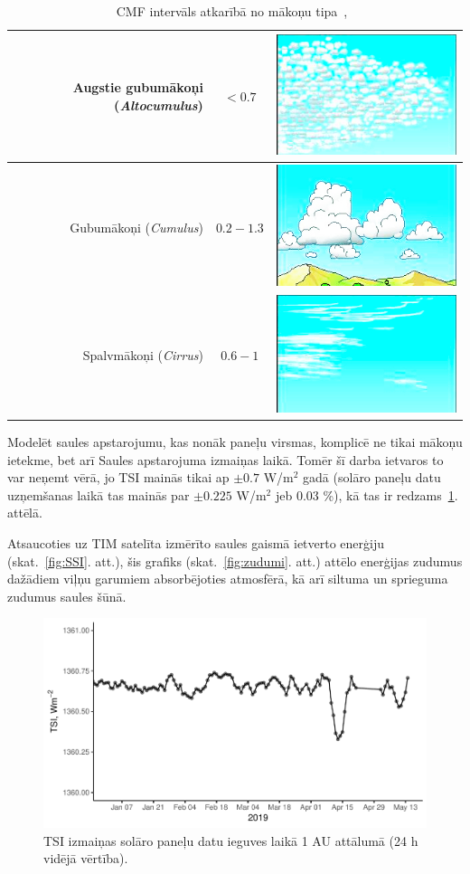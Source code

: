 \begin{table}[h]
	\caption{CMF intervāls atkarībā no mākoņu tipa~\cite{effectCloudsOnSurface},~\cite{cloudAtlas}}
	\begin{center}
		\begin{tabular}{| r | c | c |}
			\hline
			Augstie gubumākoņi (\textit{Altocumulus}) & $<0.7$ & \includegraphics[width=0.1\linewidth]{figures/meteo/cloud_Altocumulus.jpg} \\ \hline
			Gubumākoņi (\textit{Cumulus})        & $0.2-1.3$ & \includegraphics[width=0.1\linewidth]{figures/meteo/cloud_Cumulus.jpg} \\ \hline
			Spalvmākoņi (\textit{Cirrus})        & $0.6-1$  & \includegraphics[width=0.1\linewidth]{figures/meteo/cloud_Cirrus.jpg} \\ \hline
		\end{tabular}
	\end{center}
	\label{tab:CMF}
\end{table}

Modelēt saules apstarojumu, kas nonāk paneļu virsmas, komplicē ne tikai mākoņu ietekme, bet arī Saules apstarojuma izmaiņas laikā. Tomēr šī darba ietvaros to var neņemt vērā, jo TSI mainās tikai ap $\pm 0.7$ W/m$^2$ gadā (solāro paneļu datu uzņemšanas laikā tas mainās par $\pm 0.225$ W/m$^2$ jeb 0.03 \%), kā tas ir redzams~\ref{fig:TSI2}. attēlā.

Atsaucoties uz TIM satelīta izmērīto saules gaismā ietverto enerģiju (skat.~\ref{fig:SSI}. att.), šis grafiks (skat.~\ref{fig:zudumi}. att.) attēlo enerģijas zudumus dažādiem viļņu garumiem absorbējoties atmosfērā, kā arī siltuma un sprieguma zudumus saules šūnā.

\begin{figure}[h]
    \centering
    \includegraphics[width=\linewidth]{figures/misc/TSI.pdf}
    \caption{TSI izmaiņas solāro paneļu datu ieguves laikā 1 AU attālumā (24 h vidējā vērtība)\cite{TSIdata}.}
    \label{fig:TSI2}
\end{figure}


